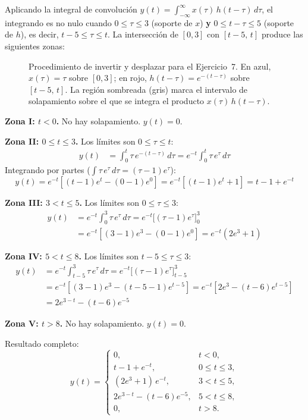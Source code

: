 \documentclass[10pt,a4paper]{article}
\begin{document}
	Aplicando la integral de convolución $y(t) = \int_{-\infty}^{\infty} x(\tau)\,h(t-\tau)\,d\tau$, el integrando es no nulo cuando $0 \leq \tau \leq 3$ (soporte de $x$) \textbf{y} $0 \leq t-\tau \leq 5$ (soporte de $h$), es decir, $t-5 \leq \tau \leq t$. La intersección de $[0,3]$ con $[t-5,\, t]$ produce las siguientes zonas:
	
	\begin{figure}[H]
	\centering
	
	\caption{Procedimiento de invertir y desplazar para el Ejercicio~7.
	         En azul, $x(\tau) = \tau$ sobre $[0,3]$; en rojo,
	         $h(t-\tau) = e^{-(t-\tau)}$ sobre $[t-5,\, t]$.
	         La región sombreada (gris) marca el intervalo de solapamiento sobre el que se integra el producto $x(\tau)\,h(t-\tau)$.}
	\end{figure}
	
	\textbf{Zona I: $t < 0$.} No hay solapamiento. $y(t) = 0$.
	
	\textbf{Zona II: $0 \leq t \leq 3$.} Los límites son $0 \leq \tau \leq t$:
	\begin{align*}
	y(t) &= \int_0^t \tau\,e^{-(t-\tau)}\,d\tau = e^{-t}\int_0^t \tau\,e^{\tau}\,d\tau
	\end{align*}
	Integrando por partes ($\int \tau\,e^\tau\,d\tau = (\tau-1)e^\tau$):
	\[
	y(t) = e^{-t}\left[(t-1)e^t - (0-1)e^0\right] = e^{-t}\left[(t-1)e^t + 1\right] = t - 1 + e^{-t}
	\]
	
	\textbf{Zona III: $3 < t \leq 5$.} Los límites son $0 \leq \tau \leq 3$:
	\begin{align*}
	y(t) &= e^{-t}\int_0^3 \tau\,e^{\tau}\,d\tau = e^{-t}\bigl[(\tau-1)e^{\tau}\bigr]_{0}^{3} \\
	&= e^{-t}\left[(3-1)e^{3} - (0-1)e^{0}\right] = e^{-t}(2e^{3} + 1)
	\end{align*}
	
	\textbf{Zona IV: $5 < t \leq 8$.} Los límites son $t-5 \leq \tau \leq 3$:
	\begin{align*}
	y(t) &= e^{-t}\int_{t-5}^{3} \tau\,e^{\tau}\,d\tau = e^{-t}\bigl[(\tau-1)e^{\tau}\bigr]_{t-5}^{3} \\
	&= e^{-t}\left[(3-1)e^{3} - (t-5-1)e^{t-5}\right] = e^{-t}\left[2e^{3} - (t-6)e^{t-5}\right] \\
	&= 2e^{3-t} - (t-6)e^{-5}
	\end{align*}
	
	\textbf{Zona V: $t > 8$.} No hay solapamiento. $y(t) = 0$.
	
	Resultado completo:
	\[
	\boxed{y(t) = \begin{cases}
	0, & t < 0, \\
	t - 1 + e^{-t}, & 0 \leq t \leq 3, \\
	(2e^3+1)\,e^{-t}, & 3 < t \leq 5, \\
	2e^{3-t} - (t-6)e^{-5}, & 5 < t \leq 8, \\
	0, & t > 8.
	\end{cases}}
	\]
\end{document}
